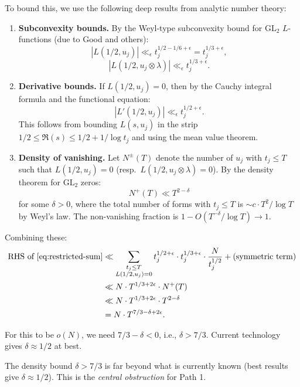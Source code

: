 \documentclass[11pt,a4paper]{article}
\theoremstyle{plain}
\theoremstyle{definition}
\newcommand{\GL}{\mathrm{GL}}
\begin{document}
To bound this, we use the following deep results from analytic number theory:

\begin{enumerate}[label=\textbf{P3.\arabic*:}]
\item \textbf{Subconvexity bounds.} By the Weyl-type subconvexity bound for $\GL_2$ $L$-functions (due to Good and others):
\[
|L(1/2, u_j)| \ll_\epsilon t_j^{1/2 - 1/6 + \epsilon} = t_j^{1/3 + \epsilon},
\]
\[
|L(1/2, u_j \otimes \lambda)| \ll_\epsilon t_j^{1/3 + \epsilon}.
\]

\item \textbf{Derivative bounds.} If $L(1/2, u_j) = 0$, then by the Cauchy integral formula and the functional equation:
\[
|L'(1/2, u_j)| \ll_\epsilon t_j^{1/2 + \epsilon}.
\]
This follows from bounding $L(s, u_j)$ in the strip $1/2 \leq \Re(s) \leq 1/2 + 1/\log t_j$ and using the mean value theorem.

\item \textbf{Density of vanishing.} Let $N^\pm(T)$ denote the number of $u_j$ with $t_j \leq T$ such that $L(1/2, u_j) = 0$ (resp.\ $L(1/2, u_j \otimes \lambda) = 0$). By the density theorem for $\GL_2$ zeros:
\[
N^+(T) \ll T^{2 - \delta}
\]
for some $\delta > 0$, where the total number of forms with $t_j \leq T$ is $\sim c \cdot T^2 / \log T$ by Weyl's law. The non-vanishing fraction is $1 - O(T^{-\delta}/\log T) \to 1$.
\end{enumerate}

Combining these:
\begin{align*}
\text{RHS of \eqref{eq:restricted-sum}} &\ll \sum_{\substack{t_j \leq T \\ L(1/2, u_j) = 0}} t_j^{1/2+\epsilon} \cdot t_j^{1/3+\epsilon} \cdot \frac{N}{t_j^{1/2}} + \text{(symmetric term)} \\
&\ll N \cdot T^{1/3+2\epsilon} \cdot N^+(T) \\
&\ll N \cdot T^{1/3+2\epsilon} \cdot T^{2-\delta} \\
&= N \cdot T^{7/3 - \delta + 2\epsilon}.
\end{align*}

For this to be $o(N)$, we need $7/3 - \delta < 0$, i.e., $\delta > 7/3$. Current technology gives $\delta \approx 1/2$ at best.

\begin{obstacle}
The density bound $\delta > 7/3$ is far beyond what is currently known (best results give $\delta \approx 1/2$). This is the \emph{central obstruction} for Path 1.
\end{obstacle}
\end{document}
